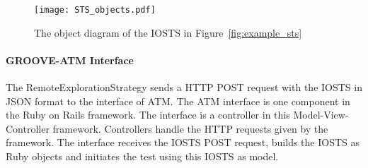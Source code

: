 \begin{figure}[ht]
  \begin{center}
    \texttt{[image: STS\_objects.pdf]}
  \end{center}
  \caption{The object diagram of the IOSTS in Figure~\ref{fig:example_sts}}
  \label{fig:sts-objects}
\end{figure}

\paragraph*{GROOVE-ATM Interface}
The RemoteExplorationStrategy sends a HTTP POST request with the IOSTS in JSON format to the interface of ATM.
The ATM interface is one component in the Ruby on Rails framework. The interface is a controller in this Model-View-Controller framework. Controllers handle the HTTP requests given by the framework. The interface receives the IOSTS POST request, builds the IOSTS as Ruby objects and initiates the test using this IOSTS as model.